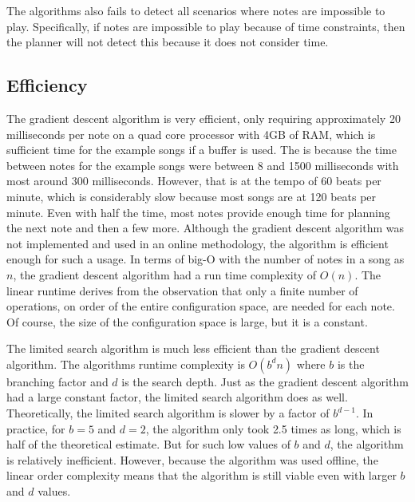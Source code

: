 \documentclass[letterpaper, 10 pt, conference]{ieeeconf}  %
\begin{document}
The algorithms also fails to detect all scenarios where notes are impossible to play. Specifically, if notes are impossible to play because of time constraints, then the planner will not detect this because it does not consider time.

\subsection{Efficiency}

The gradient descent algorithm is very efficient, only requiring approximately 20 milliseconds per note on a quad core processor with 4GB of RAM, which is sufficient time for the example songs if a buffer is used. The is because the time between notes for the example songs were between 8 and 1500 milliseconds with most around 300 milliseconds. However, that is at the tempo of 60 beats per minute, which is considerably slow because most songs are at 120 beats per minute. Even with half the time, most notes provide enough time for planning the next note and then a few more. Although the gradient descent algorithm was not implemented and used in an online methodology, the algorithm is efficient enough for such a usage. In terms of big-O with the number of notes in a song as $n$, the gradient descent algorithm had a run time complexity of $O(n)$. The linear runtime derives from the observation that only a finite number of operations, on order of the entire configuration space, are needed for each note. Of course, the size of the configuration space is large, but it is a constant.

The limited search algorithm is much less efficient than the gradient descent algorithm. The algorithms runtime complexity is $O(b^d n)$ where $b$ is the branching factor and $d$ is the search depth. Just as the gradient descent algorithm had a large constant factor, the limited search algorithm does as well. Theoretically, the limited search algorithm is slower by a factor of $b^{d - 1}$. In practice, for $b=5$ and $d=2$, the algorithm only took 2.5 times as long, which is half of the theoretical estimate. But for such low values of $b$ and $d$, the algorithm is relatively inefficient. However, because the algorithm was used offline, the linear order complexity means that the algorithm is still viable even with larger $b$ and $d$ values.
\end{document}
